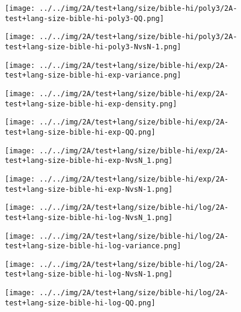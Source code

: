 \begin{figure}[H]
\centering	\texttt{[image: ../../img/2A/test+lang/size/bible-hi/poly3/2A-test+lang-size-bible-hi-poly3-QQ.png]}
\end{figure}
\begin{figure}[H]
\centering	\texttt{[image: ../../img/2A/test+lang/size/bible-hi/poly3/2A-test+lang-size-bible-hi-poly3-NvsN-1.png]}
\end{figure}
\begin{figure}[H]
\centering	\texttt{[image: ../../img/2A/test+lang/size/bible-hi/exp/2A-test+lang-size-bible-hi-exp-variance.png]}
\end{figure}
\begin{figure}[H]
\centering	\texttt{[image: ../../img/2A/test+lang/size/bible-hi/exp/2A-test+lang-size-bible-hi-exp-density.png]}
\end{figure}
\begin{figure}[H]
\centering	\texttt{[image: ../../img/2A/test+lang/size/bible-hi/exp/2A-test+lang-size-bible-hi-exp-QQ.png]}
\end{figure}
\begin{figure}[H]
\centering	\texttt{[image: ../../img/2A/test+lang/size/bible-hi/exp/2A-test+lang-size-bible-hi-exp-NvsN\_1.png]}
\end{figure}
\begin{figure}[H]
\centering	\texttt{[image: ../../img/2A/test+lang/size/bible-hi/exp/2A-test+lang-size-bible-hi-exp-NvsN-1.png]}
\end{figure}
\begin{figure}[H]
\centering	\texttt{[image: ../../img/2A/test+lang/size/bible-hi/log/2A-test+lang-size-bible-hi-log-NvsN\_1.png]}
\end{figure}
\begin{figure}[H]
\centering	\texttt{[image: ../../img/2A/test+lang/size/bible-hi/log/2A-test+lang-size-bible-hi-log-variance.png]}
\end{figure}
\begin{figure}[H]
\centering	\texttt{[image: ../../img/2A/test+lang/size/bible-hi/log/2A-test+lang-size-bible-hi-log-NvsN-1.png]}
\end{figure}
\begin{figure}[H]
\centering	\texttt{[image: ../../img/2A/test+lang/size/bible-hi/log/2A-test+lang-size-bible-hi-log-QQ.png]}
\end{figure}
